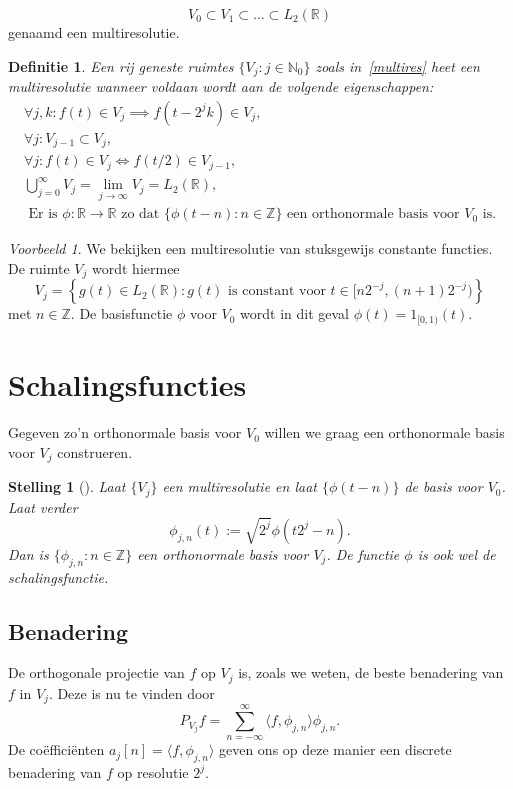 \documentclass[11pt]{report}
\newcommand{\R}{\mathbb{R}}
\newcommand{\N}{\mathbb{N}}
\newcommand{\Z}{\mathbb{Z}}
\theoremstyle{plain}
\newtheorem*{stelling}{Stelling}
\newtheorem*{definitie}{Definitie}
\theoremstyle{remark}
\newtheorem*{voorbeeld}{Voorbeeld}
\begin{document}
\begin{equation}
  \label{multires}
  V_0 \subset V_1 \subset \ldots \subset L_2(\R)
\end{equation}
genaamd een multiresolutie.
\begin{definitie}
Een rij geneste ruimtes $\{ V_j: j \in \N_0 \}$ zoals in~\ref{multires} heet een multiresolutie wanneer voldaan wordt aan de volgende eigenschappen:
\begin{eqnarray}
  \forall j, k: f(t) \in V_j \implies f(t - 2^j k) \in V_j, \\
  \forall j: V_{j-1} \subset V_j, \\
  \forall j: f(t) \in V_j \iff f(t/2) \in V_{j-1}, \\
  \bigcup_{j=0}^{\infty} V_j = \lim_{j\to\infty} V_j = L_2(\R), \\
  \text{ Er is $\phi: \R \to \R$ zo dat $\{ \phi(t-n): n \in \Z \}$ een orthonormale basis voor $V_0$ is.}
\end{eqnarray}
\end{definitie}

\begin{voorbeeld} We bekijken een multiresolutie van stuksgewijs constante functies. De ruimte $V_j$ wordt hiermee
\[
	V_j = \left\{ g(t) \in L_2(\R): g(t)\text{ is constant voor }t \in [n 2^{-j}, (n+1)2^{-j}) \right \}
\] met $n \in \Z$. De basisfunctie $\phi$ voor $V_0$ wordt in dit geval $\phi(t) = 1_{[0,1)}(t)$. \end{voorbeeld}

\section{Schalingsfuncties}
Gegeven zo'n orthonormale basis voor $V_0$ willen we graag een orthonormale basis voor $V_j$ construeren. 
\begin{stelling}[{\cite[T7.1]{mallat}}] 
  Laat $\{ V_j \}$ een multiresolutie en laat $\{\phi(t-n) \}$ de basis voor $V_0$. Laat verder
  \[
    \phi_{j,n}(t) := \sqrt{2^j} \phi\left( t2^j - n \right).
  \]
  Dan is $\{ \phi_{j,n}: n \in \Z \}$ een orthonormale basis voor $V_j$. De functie $\phi$ is ook wel de \emph{schalingsfunctie}.
\end{stelling}
\subsection{Benadering} De orthogonale projectie van $f$ op $V_j$ is, zoals we weten, de beste benadering van $f$ in $V_j$. Deze is nu te vinden door
\[
	P_{V_j} f = \sum_{n=-\infty}^\infty \langle f, \phi_{j,n} \rangle \phi_{j,n}.
\]
De co\"effici\"enten $a_j[n] = \langle f, \phi_{j,n} \rangle$ geven ons op deze manier een discrete benadering van $f$ op resolutie $2^j$.
\end{document}

